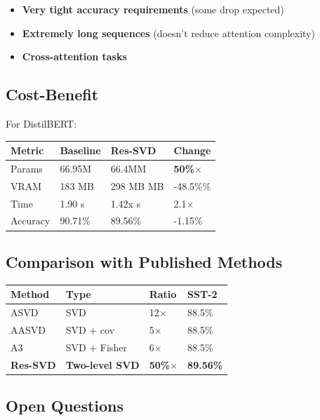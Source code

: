 \begin{itemize}
\item \textbf{Very tight accuracy requirements} (some drop expected)
\item \textbf{Extremely long sequences} (doesn't reduce attention complexity)
\item \textbf{Cross-attention tasks}

\end{itemize}
\subsection{Cost-Benefit}

For DistilBERT:

\begin{table}[H]
\centering
\small
\begin{tabular}{llll}
\toprule
\textbf{Metric} & \textbf{Baseline} & \textbf{Res-SVD} & \textbf{Change} \\
\midrule
Params & 66.95M & 66.4MM & \textbf{50\%$\times$} \\
VRAM & 183 MB & 298 MB MB & -48.5\%\% \\
Time & 1.90 s & 1.42x s & 2.1$\times$ \\
Accuracy & 90.71\% & 89.56\% & -1.15\% \\
\bottomrule
\end{tabular}
\end{table}

\subsection{Comparison with Published Methods}

\begin{table}[H]
\centering
\small
\begin{tabular}{llll}
\toprule
\textbf{Method} & \textbf{Type} & \textbf{Ratio} & \textbf{SST-2} \\
\midrule
ASVD & SVD & 12$\times$ & 88.5\% \\
AASVD & SVD + cov & 5$\times$ & 88.5\% \\
A3 & SVD + Fisher & 6$\times$ & 88.5\% \\
\textbf{Res-SVD} & \textbf{Two-level SVD} & \textbf{50\%$\times$} & \textbf{89.56\%} \\
\bottomrule
\end{tabular}
\end{table}

\subsection{Open Questions}

